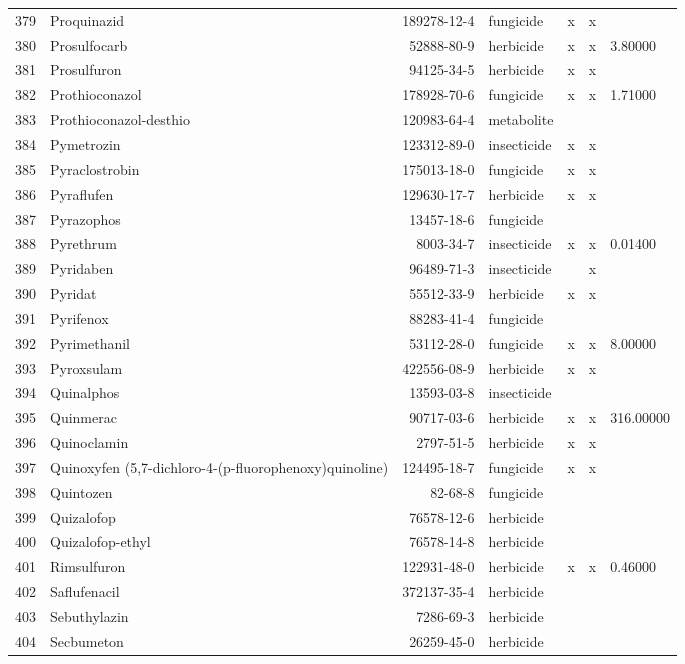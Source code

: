 \begin{longtable}{lp{3cm}rlp{1cm}p{1cm}p{1.5cm}}
  379 & Proquinazid & 189278-12-4 & fungicide & x & x &  \\ 
  380 & Prosulfocarb & 52888-80-9 & herbicide & x & x & 3.80000 \\ 
  381 & Prosulfuron & 94125-34-5 & herbicide & x & x &  \\ 
  382 & Prothioconazol & 178928-70-6 & fungicide & x & x & 1.71000 \\ 
  383 & Prothioconazol-desthio & 120983-64-4 & metabolite &  &  &  \\ 
  384 & Pymetrozin & 123312-89-0 & insecticide & x & x &  \\ 
  385 & Pyraclostrobin & 175013-18-0 & fungicide & x & x &  \\ 
  386 & Pyraflufen & 129630-17-7 & herbicide & x & x &  \\ 
  387 & Pyrazophos & 13457-18-6 & fungicide &  &  &  \\ 
  388 & Pyrethrum & 8003-34-7 & insecticide & x & x & 0.01400 \\ 
  389 & Pyridaben & 96489-71-3 & insecticide &  & x &  \\ 
  390 & Pyridat & 55512-33-9 & herbicide & x & x &  \\ 
  391 & Pyrifenox & 88283-41-4 & fungicide &  &  &  \\ 
  392 & Pyrimethanil & 53112-28-0 & fungicide & x & x & 8.00000 \\ 
  393 & Pyroxsulam & 422556-08-9 & herbicide & x & x &  \\ 
  394 & Quinalphos & 13593-03-8 & insecticide &  &  &  \\ 
  395 & Quinmerac & 90717-03-6 & herbicide & x & x & 316.00000 \\ 
  396 & Quinoclamin & 2797-51-5 & herbicide & x & x &  \\ 
  397 & Quinoxyfen (5,7-di\-chloro-4-(p-fluoro\-phenoxy)\-quinoline) & 124495-18-7 & fungicide & x & x &  \\ 
  398 & Quintozen & 82-68-8 & fungicide &  &  &  \\ 
  399 & Quizalofop & 76578-12-6 & herbicide &  &  &  \\ 
  400 & Quizalofop-ethyl & 76578-14-8 & herbicide &  &  &  \\ 
  401 & Rimsulfuron & 122931-48-0 & herbicide & x & x & 0.46000 \\ 
  402 & Saflufenacil & 372137-35-4 & herbicide &  &  &  \\ 
  403 & Sebuthylazin & 7286-69-3 & herbicide &  &  &  \\ 
  404 & Secbumeton & 26259-45-0 & herbicide &  &  &  \\ 

\end{longtable}
